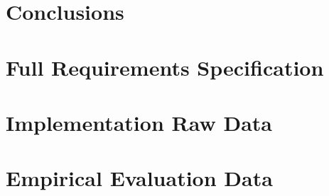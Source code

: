 \documentclass[11pt, a4paper, openright]{report}
\begin{document}
\chapter{Conclusions}
\label{c:conclusions}




\begin{appendices}
\chapter{Full Requirements Specification}


\chapter{Implementation Raw Data}


\chapter{Empirical Evaluation Data}

	
\end{appendices}
\end{document}
